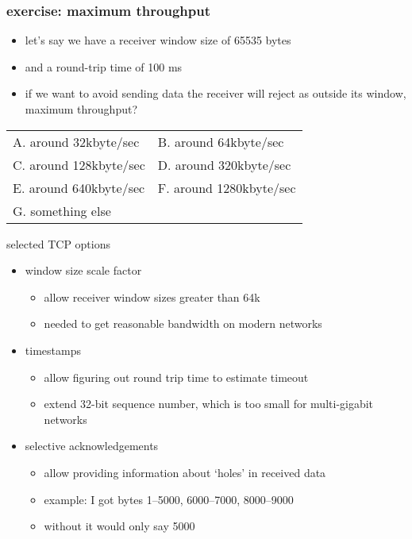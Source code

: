 \begin{frame}\frametitle{exercise: maximum throughput}
    \begin{itemize}
    \item let's say we have a receiver window size of 65535 bytes
    \item and a round-trip time of 100 ms
    \vspace{.5cm}
    \item if we want to avoid sending data the receiver will reject as outside
    its window, maximum throughput?
    \end{itemize}
\begin{tabular}{ll}
A. around 32kbyte/sec &
B. around 64kbyte/sec \\
C. around 128kbyte/sec &
D. around 320kbyte/sec \\
E. around 640kbyte/sec &
F. around 1280kbyte/sec \\
G. something else \\
\end{tabular}
\end{frame}

\begin{frame}{selected TCP options}
    \begin{itemize}
    \item window size scale factor
        \begin{itemize}
        \item allow receiver window sizes greater than 64k
        \item needed to get reasonable bandwidth on modern networks
        \end{itemize}
    \item timestamps
        \begin{itemize}
        \item allow figuring out round trip time to estimate timeout
        \item extend 32-bit sequence number, which is too small for multi-gigabit networks
        \end{itemize}
    \item selective acknowledgements
        \begin{itemize}
        \item allow providing information about `holes' in received data
        \item example: I got bytes 1--5000, 6000--7000, 8000--9000
        \item without it would only say 5000
        \end{itemize}
    \end{itemize}
\end{frame}

